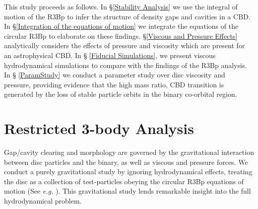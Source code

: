This study proceeds as follows. In \S \ref{Stability Analysis} we use
the integral of motion of the R3Bp to infer the structure of density
gaps and cavities in a CBD. In \S \ref{Integration
  of the equations of motion} we integrate the equations of the
circular R3Bp to elaborate on these findings. \S \ref{Viscous and
  Pressure Effects} analytically considers the effects of pressure and
viscosity which are present for an astrophysical CBD. In \S
\ref{Fiducial Simulations}, we present viscous hydrodynamical
simulations to compare with the findings of the R3Bp analysis. In \S
\ref{ParamStudy} we conduct a parameter study over disc viscosity and
pressure, providing evidence that the high mass ratio, CBD transition
is generated by the loss of stable particle orbits in the binary
co-orbital region.


\section{Restricted 3-body Analysis}
\label{Analysis via the restricted 3-body problem}
Gap/cavity clearing and morphology are governed by the gravitational
interaction between disc particles and the binary, as well as viscous
and pressure forces. We conduct a purely gravitational study by
ignoring hydrodynamical effects, treating the disc as a collection of
test-particles obeying the circular R3Bp equations of motion (See
\textit{e.g.} \cite{MDbook}). This gravitational study lends
remarkable insight into the full hydrodynamical problem.



